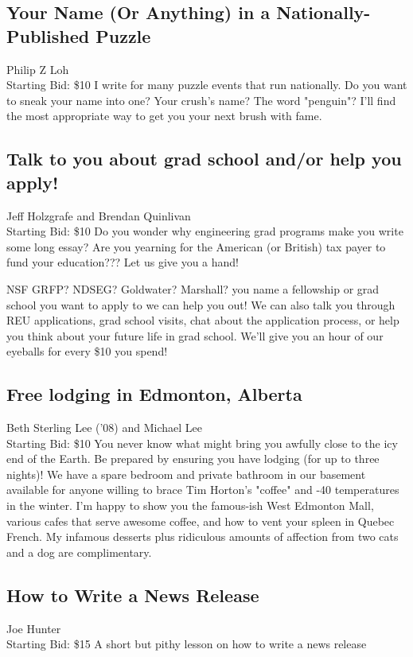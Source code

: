 \documentclass[11pt]{article}
\begin{document}
\subsection{Your Name (Or Anything) in a Nationally-Published Puzzle}
Philip Z Loh
\\
Starting Bid: \$10
\newline
I write for many puzzle events that run nationally. Do you want to sneak your name into one? Your crush's name? The word "penguin"? I'll find the most appropriate way to get you your next brush with fame.
\subsection{Talk to you about grad school and/or help you apply!}
Jeff Holzgrafe and Brendan Quinlivan
\\
Starting Bid: \$10
\newline
Do you wonder why engineering grad programs make you write some long essay? Are you yearning for the American (or British) tax payer to fund your education??? Let us give you a hand!
 
NSF GRFP? NDSEG? Goldwater? Marshall? you name a fellowship or grad school you want to apply to we can help you out! We can also talk you through REU applications, grad school visits, chat about the application process, or help you think about your future life in grad school. We’ll give you an hour of our eyeballs for every \$10 you spend!
\subsection{Free lodging in Edmonton, Alberta}
Beth Sterling Lee ('08) and Michael Lee
\\
Starting Bid: \$10
\newline
You never know what might bring you awfully close to the icy end of the Earth. Be prepared by ensuring you have lodging (for up to three nights)!  We have a spare bedroom and private bathroom in our basement available for anyone willing to brace Tim Horton's "coffee" and -40 temperatures in the winter. I'm happy to show you the famous-ish West Edmonton Mall, various cafes that serve awesome coffee, and how to vent your spleen in Quebec French. My infamous desserts plus ridiculous amounts of affection from two cats and a dog are complimentary.
\subsection{How to Write a News Release }
Joe Hunter
\\
Starting Bid: \$15
\newline
A short but pithy lesson on how to write a news release
\end{document}
